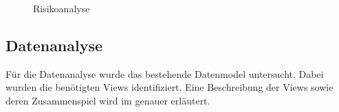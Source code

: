 \begin{figure}[htb]
\centering
{}
\caption{Risikoanalyse}
\label{fig:Risikoanalyse}
\end{figure}

\subsection{Datenanalyse}
\label{sec:Datenanalyse}
Für die Datenanalyse wurde das bestehende Datenmodel untersucht. Dabei wurden die benötigten Views identifiziert.
Eine Beschreibung der Views sowie deren Zusammenspiel wird im  genauer erläutert.

